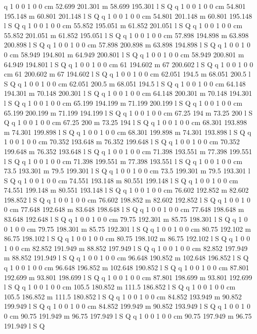 q 1 0 0 1 0 0 cm
52.699 201.301 m 58.699 195.301 l S Q
q 1 0 0 1 0 0 cm
54.801 195.148 m 60.801 201.148 l S Q
q 1 0 0 1 0 0 cm
54.801 201.148 m 60.801 195.148 l S Q
q 1 0 0 1 0 0 cm
55.852 195.051 m 61.852 201.051 l S Q
q 1 0 0 1 0 0 cm
55.852 201.051 m 61.852 195.051 l S Q
q 1 0 0 1 0 0 cm
57.898 194.898 m 63.898 200.898 l S Q
q 1 0 0 1 0 0 cm
57.898 200.898 m 63.898 194.898 l S Q
q 1 0 0 1 0 0 cm
58.949 194.801 m 64.949 200.801 l S Q
q 1 0 0 1 0 0 cm
58.949 200.801 m 64.949 194.801 l S Q
q 1 0 0 1 0 0 cm
61 194.602 m 67 200.602 l S Q
q 1 0 0 1 0 0 cm
61 200.602 m 67 194.602 l S Q
q 1 0 0 1 0 0 cm
62.051 194.5 m 68.051 200.5 l S Q
q 1 0 0 1 0 0 cm
62.051 200.5 m 68.051 194.5 l S Q
q 1 0 0 1 0 0 cm
64.148 194.301 m 70.148 200.301 l S Q
q 1 0 0 1 0 0 cm
64.148 200.301 m 70.148 194.301 l S Q
q 1 0 0 1 0 0 cm
65.199 194.199 m 71.199 200.199 l S Q
q 1 0 0 1 0 0 cm
65.199 200.199 m 71.199 194.199 l S Q
q 1 0 0 1 0 0 cm
67.25 194 m 73.25 200 l S Q
q 1 0 0 1 0 0 cm
67.25 200 m 73.25 194 l S Q
q 1 0 0 1 0 0 cm
68.301 193.898 m 74.301 199.898 l S Q
q 1 0 0 1 0 0 cm
68.301 199.898 m 74.301 193.898 l S Q
q 1 0 0 1 0 0 cm
70.352 193.648 m 76.352 199.648 l S Q
q 1 0 0 1 0 0 cm
70.352 199.648 m 76.352 193.648 l S Q
q 1 0 0 1 0 0 cm
71.398 193.551 m 77.398 199.551 l S Q
q 1 0 0 1 0 0 cm
71.398 199.551 m 77.398 193.551 l S Q
q 1 0 0 1 0 0 cm
73.5 193.301 m 79.5 199.301 l S Q
q 1 0 0 1 0 0 cm
73.5 199.301 m 79.5 193.301 l S Q
q 1 0 0 1 0 0 cm
74.551 193.148 m 80.551 199.148 l S Q
q 1 0 0 1 0 0 cm
74.551 199.148 m 80.551 193.148 l S Q
q 1 0 0 1 0 0 cm
76.602 192.852 m 82.602 198.852 l S Q
q 1 0 0 1 0 0 cm
76.602 198.852 m 82.602 192.852 l S Q
q 1 0 0 1 0 0 cm
77.648 192.648 m 83.648 198.648 l S Q
q 1 0 0 1 0 0 cm
77.648 198.648 m 83.648 192.648 l S Q
q 1 0 0 1 0 0 cm
79.75 192.301 m 85.75 198.301 l S Q
q 1 0 0 1 0 0 cm
79.75 198.301 m 85.75 192.301 l S Q
q 1 0 0 1 0 0 cm
80.75 192.102 m 86.75 198.102 l S Q
q 1 0 0 1 0 0 cm
80.75 198.102 m 86.75 192.102 l S Q
q 1 0 0 1 0 0 cm
82.852 191.949 m 88.852 197.949 l S Q
q 1 0 0 1 0 0 cm
82.852 197.949 m 88.852 191.949 l S Q
q 1 0 0 1 0 0 cm
96.648 190.852 m 102.648 196.852 l S Q
q 1 0 0 1 0 0 cm
96.648 196.852 m 102.648 190.852 l S Q
q 1 0 0 1 0 0 cm
87.801 192.699 m 93.801 198.699 l S Q
q 1 0 0 1 0 0 cm
87.801 198.699 m 93.801 192.699 l S Q
q 1 0 0 1 0 0 cm
105.5 180.852 m 111.5 186.852 l S Q
q 1 0 0 1 0 0 cm
105.5 186.852 m 111.5 180.852 l S Q
q 1 0 0 1 0 0 cm
84.852 193.949 m 90.852 199.949 l S Q
q 1 0 0 1 0 0 cm
84.852 199.949 m 90.852 193.949 l S Q
q 1 0 0 1 0 0 cm
90.75 191.949 m 96.75 197.949 l S Q
q 1 0 0 1 0 0 cm
90.75 197.949 m 96.75 191.949 l S Q
